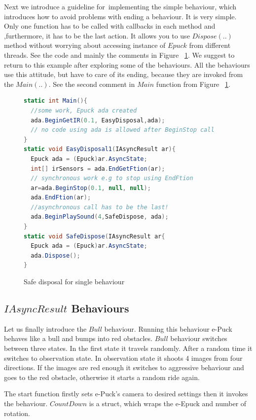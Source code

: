   Next we introduce a guideline for~implementing the simple behaviour,
  which introduces how to avoid problems with ending a behaviour.
  It is very simple. Only one function has to be called  with callbacks in each method and 
  ,furthermore, it has to be the last action. It allows you to use $Dispose(..)$ method 
  without worrying about accessing instance of $Epuck$  from different threads.
  See the code and mainly the comments in Figure ~\ref{safedis}. 
  We suggest to return to this example after exploring some of the behaviours.
  All the behaviours use this attitude, but have to care of its ending, 
  because they are invoked from the $Main(..)$. 
  See the second comment in $Main$ function from Figure ~\ref{safedis}.

\begin{figure}[!hbp]	
\begin{lstlisting}[language=cs]
static int Main(){
  //some work, Epuck ada created
  ada.BeginGetIR(0.1, EasyDisposal,ada);
  // no code using ada is allowed after BeginStop call
}
static void EasyDisposal1(IAsyncResult ar){
  Epuck ada = (Epuck)ar.AsyncState;
  int[] irSensors = ada.EndGetFtion(ar);
  // synchronous work e.g to stop using EndFtion
  ar=ada.BeginStop(0.1, null, null);
  ada.EndFtion(ar);
  //asynchronous call has to be the last!
  ada.BeginPlaySound(4,SafeDispose, ada);
}
static void SafeDispose(IAsyncResult ar{
  Epuck ada = (Epuck)ar.AsyncState;
  ada.Dispose();
}
\end{lstlisting}
\caption{Safe disposal for single behaviour} \label{safedis}
\end{figure}

\subsection{$IAsyncResult$ Behaviours}\label{sec:iabehaviors}\label{sec:bull}
  Let us finally introduce the $Bull$ behaviour.
  Running this behaviour e-Puck behaves like a bull and bumps into red obstacles.
  $Bull$ behaviour switches between three states. In the first state it travels randomly. 
  After a random time it switches to observation state.
  In observation state it shoots 4 images from four directions. If the images are red enough 
  it switches to aggressive behaviour and goes to the red obstacle,
  otherwise it starts a random ride again.

  
  The start function firstly sets e-Puck's camera to desired settings then it invokes the behaviour.
  $CountDown$ is a struct, which wraps the e-Epuck and number of rotation.

